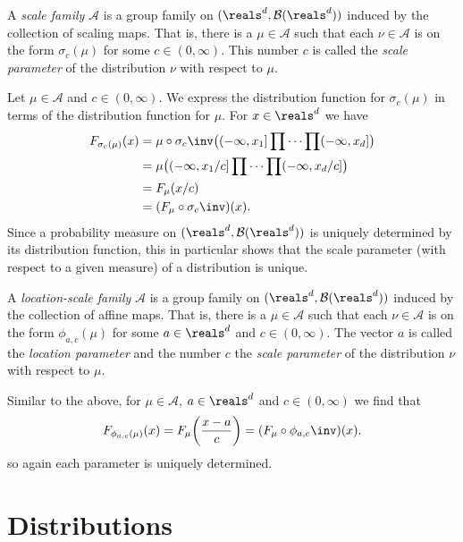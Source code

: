 \documentclass[article, a4paper, 11pt, oneside]{memoir}
\numberwithin{equation}{chapter}
\newcommand{\calA}{\mathcal{A}}
\newcommand{\borel}{\mathcal{B}}
\begin{document}
\begin{definition}
    A \emph{scale family} $\calA$ is a group family on $(\reals^d,\borel(\reals^d))$ induced by the collection of scaling maps. That is, there is a $\mu \in \calA$ such that each $\nu \in \calA$ is on the form $\sigma_c(\mu)$ for some $c \in (0,\infty)$. This number $c$ is called the \emph{scale parameter} of the distribution $\nu$ with respect to $\mu$.
\end{definition}
%
Let $\mu \in \calA$ and $c \in (0,\infty)$. We express the distribution function for $\sigma_c(\mu)$ in terms of the distribution function for $\mu$. For $x \in \reals^d$ we have
%
\begin{align*}
    F_{\sigma_c(\mu)}(x)
        &= \mu \circ \sigma_c\inv \bigl( (-\infty,x_1] \prod \cdots \prod (-\infty,x_d] \bigr) \\
        &= \mu \bigl( (-\infty,x_1/c] \prod \cdots \prod (-\infty,x_d/c] \bigr) \\
        &= F_\mu(x/c) \\
        &= (F_\mu \circ \sigma_c\inv)(x).
\end{align*}
%
Since a probability measure on $(\reals^d, \borel(\reals^d))$ is uniquely determined by its distribution function, this in particular shows that the scale parameter (with respect to a given measure) of a distribution is unique.


\begin{definition}
    A \emph{location-scale family} $\calA$ is a group family on $(\reals^d,\borel(\reals^d))$ induced by the collection of affine maps. That is, there is a $\mu \in \calA$ such that each $\nu \in \calA$ is on the form $\phi_{a,c}(\mu)$ for some $a \in \reals^d$ and $c \in (0,\infty)$. The vector $a$ is called the \emph{location parameter} and the number $c$ the \emph{scale parameter} of the distribution $\nu$ with respect to $\mu$.
\end{definition}
%
Similar to the above, for $\mu \in \calA$, $a \in \reals^d$ and $c \in (0,\infty)$ we find that
%
\begin{equation*}
    F_{\phi_{a,c}(\mu)}(x)
        = F_\mu \biggl( \frac{x-a}{c} \biggr)
        = (F_\mu \circ \phi_{a,c}\inv)(x).
\end{equation*}
%
so again each parameter is uniquely determined.


\chapter{Distributions}
\end{document}
